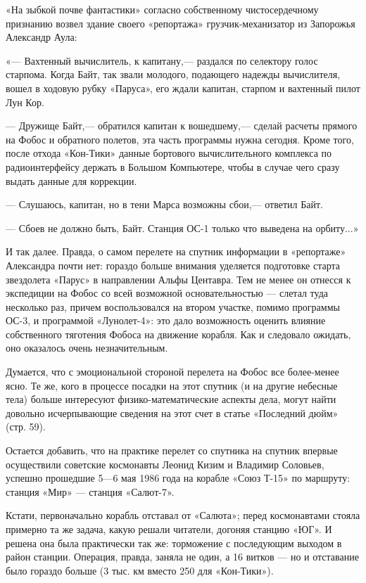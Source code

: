 \documentclass[11pt,a4paper,oneside]{article}
\begin{document}
«На зыбкой почве фантастики» согласно собственному чистосердечному признанию возвел здание своего «репортажа» грузчик-механизатор из Запорожья Александр Аула:

«— Вахтенный вычислитель, к капитану,— раздался по селектору голос старпома. Когда Байт, так звали молодого, подающего надежды вычислителя, вошел в ходовую рубку «Паруса», его ждали капитан, старпом и вахтенный пилот Лун Кор.

— Дружище Байт,— обратился капитан к вошедшему,— сделай расчеты прямого на Фобос и обратного полетов, эта часть программы нужна сегодня. Кроме того, после отхода «Кон-Тики» данные бортового вычислительного комплекса по радиоинтерфейсу держать в Большом Компьютере, чтобы в случае чего сразу выдать данные для коррекции.

— Слушаюсь, капитан, но в тени Марса возможны сбои,— ответил Байт.

— Сбоев не должно быть, Байт. Станция ОС-1 только что выведена на орбиту...»

И так далее. Правда, о самом перелете на спутник информации в «репортаже» Александра почти нет: гораздо больше внимания уделяется подготовке старта звездолета «Парус» в направлении Альфы Центавра. Тем не менее он отнесся к экспедиции на Фобос со всей возможной основательностью — слетал туда несколько раз, причем воспользовался на втором участке, помимо программы ОС-3, и программой «Лунолет-4»: это дало возможность оценить влияние собственного тяготения Фобоса на движение корабля. Как и следовало ожидать, оно оказалось очень незначительным.

Думается, что с эмоциональной стороной перелета на Фобос все более-менее ясно. Те же, кого в процессе посадки на этот спутник (и на другие небесные тела) больше интересуют физико-математические аспекты дела, могут найти довольно исчерпывающие сведения на этот счет в статье «Последний дюйм» (стр. 59).

Остается добавить, что на практике перелет со спутника на спутник впервые осуществили советские космонавты Леонид Кизим и Владимир Соловьев, успешно прошедшие 5—6 мая 1986 года на корабле «Союз Т-15» по маршруту: станция «Мир» — станция «Салют-7».

Кстати, первоначально корабль отставал от «Салюта»; перед космонавтами стояла примерно та же задача, какую решали читатели, догоняя станцию «ЮГ». И решена она была практически так же: торможение с последующим выходом в район станции. Операция, правда, заняла не один, а 16 витков — но и отставание было гораздо больше (3 тыс. км вместо 250 для «Кон-Тики»).
\end{document}
